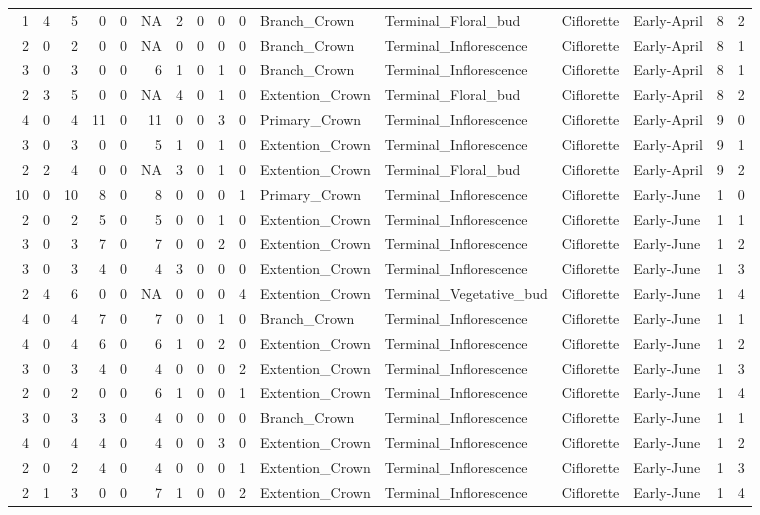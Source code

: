 \documentclass[]{article}
\begin{document}
\begin{longtable}[]{@{}rrrrrrrrrrllllrl@{}}
1 & 4 & 5 & 0 & 0 & NA & 2 & 0 & 0 & 0 & Branch\_Crown &
Terminal\_Floral\_bud & Ciflorette & Early-April & 8 & 2\tabularnewline
2 & 0 & 2 & 0 & 0 & NA & 0 & 0 & 0 & 0 & Branch\_Crown &
Terminal\_Inflorescence & Ciflorette & Early-April & 8 &
1\tabularnewline
3 & 0 & 3 & 0 & 0 & 6 & 1 & 0 & 1 & 0 & Branch\_Crown &
Terminal\_Inflorescence & Ciflorette & Early-April & 8 &
1\tabularnewline
2 & 3 & 5 & 0 & 0 & NA & 4 & 0 & 1 & 0 & Extention\_Crown &
Terminal\_Floral\_bud & Ciflorette & Early-April & 8 & 2\tabularnewline
4 & 0 & 4 & 11 & 0 & 11 & 0 & 0 & 3 & 0 & Primary\_Crown &
Terminal\_Inflorescence & Ciflorette & Early-April & 9 &
0\tabularnewline
3 & 0 & 3 & 0 & 0 & 5 & 1 & 0 & 1 & 0 & Extention\_Crown &
Terminal\_Inflorescence & Ciflorette & Early-April & 9 &
1\tabularnewline
2 & 2 & 4 & 0 & 0 & NA & 3 & 0 & 1 & 0 & Extention\_Crown &
Terminal\_Floral\_bud & Ciflorette & Early-April & 9 & 2\tabularnewline
10 & 0 & 10 & 8 & 0 & 8 & 0 & 0 & 0 & 1 & Primary\_Crown &
Terminal\_Inflorescence & Ciflorette & Early-June & 1 & 0\tabularnewline
2 & 0 & 2 & 5 & 0 & 5 & 0 & 0 & 1 & 0 & Extention\_Crown &
Terminal\_Inflorescence & Ciflorette & Early-June & 1 & 1\tabularnewline
3 & 0 & 3 & 7 & 0 & 7 & 0 & 0 & 2 & 0 & Extention\_Crown &
Terminal\_Inflorescence & Ciflorette & Early-June & 1 & 2\tabularnewline
3 & 0 & 3 & 4 & 0 & 4 & 3 & 0 & 0 & 0 & Extention\_Crown &
Terminal\_Inflorescence & Ciflorette & Early-June & 1 & 3\tabularnewline
2 & 4 & 6 & 0 & 0 & NA & 0 & 0 & 0 & 4 & Extention\_Crown &
Terminal\_Vegetative\_bud & Ciflorette & Early-June & 1 &
4\tabularnewline
4 & 0 & 4 & 7 & 0 & 7 & 0 & 0 & 1 & 0 & Branch\_Crown &
Terminal\_Inflorescence & Ciflorette & Early-June & 1 & 1\tabularnewline
4 & 0 & 4 & 6 & 0 & 6 & 1 & 0 & 2 & 0 & Extention\_Crown &
Terminal\_Inflorescence & Ciflorette & Early-June & 1 & 2\tabularnewline
3 & 0 & 3 & 4 & 0 & 4 & 0 & 0 & 0 & 2 & Extention\_Crown &
Terminal\_Inflorescence & Ciflorette & Early-June & 1 & 3\tabularnewline
2 & 0 & 2 & 0 & 0 & 6 & 1 & 0 & 0 & 1 & Extention\_Crown &
Terminal\_Inflorescence & Ciflorette & Early-June & 1 & 4\tabularnewline
3 & 0 & 3 & 3 & 0 & 4 & 0 & 0 & 0 & 0 & Branch\_Crown &
Terminal\_Inflorescence & Ciflorette & Early-June & 1 & 1\tabularnewline
4 & 0 & 4 & 4 & 0 & 4 & 0 & 0 & 3 & 0 & Extention\_Crown &
Terminal\_Inflorescence & Ciflorette & Early-June & 1 & 2\tabularnewline
2 & 0 & 2 & 4 & 0 & 4 & 0 & 0 & 0 & 1 & Extention\_Crown &
Terminal\_Inflorescence & Ciflorette & Early-June & 1 & 3\tabularnewline
2 & 1 & 3 & 0 & 0 & 7 & 1 & 0 & 0 & 2 & Extention\_Crown &
Terminal\_Inflorescence & Ciflorette & Early-June & 1 & 4\tabularnewline

\end{longtable}
\end{document}
